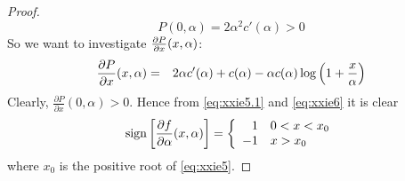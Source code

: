 \documentclass[11pt,a4]{amsart}
\newcommand{\pd}{\partial}
\newcommand{\1}{{\mathbf 1}}
\begin{document}
\begin{proof}
  \begin{equation}
    \label{eq:xxie5.1}
    P(0, \alpha) = 2 \alpha^2 c'(\alpha) > 0
  \end{equation}
  So we want to investigate ${\pd P \over \pd x}(x, \alpha)$:
  \begin{eqnarray}
    {\pd P \over \pd x}(x, \alpha) &=&
    2 \alpha c'(\alpha) + c(\alpha) - \alpha c(\alpha) \log\left(
      1 + {x \over \alpha}
    \right)
    \label{eq:xxie6}
  \end{eqnarray}
  Clearly, $\frac{\pd P}{\pd x}(0, \alpha) > 0$. Hence from
  \eqref{eq:xxie5.1} and
  \eqref{eq:xxie6} it is clear
  \begin{equation*}
    \text{sign}\left[
      {\pd f \over \pd\alpha}(x, \alpha)
    \right]
    = \left\{
    \begin{array}{rl}
      1 & 0 < x < x_0 \\
      -1 & x > x_0
    \end{array}
    \right.
  \end{equation*}
  where $x_0$ is the positive root of \eqref{eq:xxie5}.
\end{proof}
\end{document}
